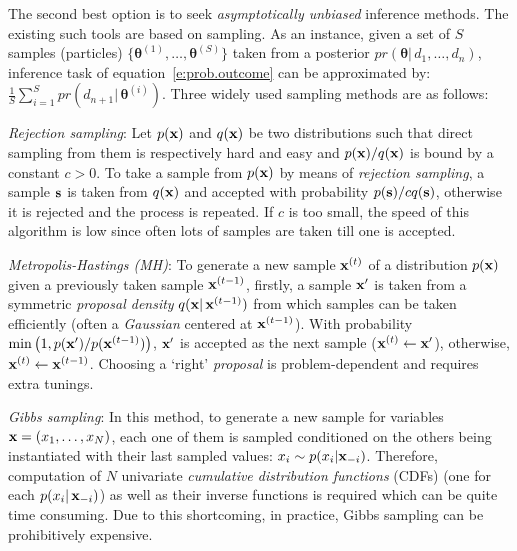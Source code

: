 The second best option is to seek \emph{asymptotically unbiased} inference methods. 
The existing such tools are based on sampling.
As an instance, given a set of $S$ samples (particles) $\{\boldsymbol\theta^{(1)}, \ldots, \boldsymbol\theta^{(S)}\}$ taken from a posterior $pr(\boldsymbol\theta | \, d_1, \ldots, d_n)$, 
inference task of equation~\ref{e:prob.outcome} can be approximated by: 
$\frac{1}{S} \sum_{i=1}^S pr(d_{n+1} | \, \boldsymbol\theta^{(i)})$.
Three widely used sampling methods are as follows:

\emph{Rejection sampling}:
Let $p(\textbf{x})$ and $q(\textbf{x})$ be two distributions 
such that direct sampling from them is respectively hard and easy
and
$p(\textbf{x})/q(\textbf{x})$ is bound by a constant $c>0$. 
To take a sample from $p(\textbf{x})$ by means of \emph{rejection sampling}, 
a sample $\textbf{s}$ is taken from $q(\textbf{x})$ and accepted with probability $p(\textbf{s}) / c q(\textbf{s})$, 
otherwise it is rejected and the process is repeated. 
If $c$ is too small, the speed of this algorithm is low since often lots of samples are taken till one is accepted.

\emph{Metropolis-Hastings (MH)}:
To generate a new sample $\textbf{x}^{(t)}$ of a distribution $p(\textbf{x})$ given a previously taken sample $\textbf{x}^{(t-1)}$, 
firstly, a sample $\textbf{x}'$ is taken 
from a symmetric \emph{proposal density} $q(\textbf{x} |\, \textbf{x}^{(t-1)})$ 
from which samples can be taken efficiently 
(often a \emph{Gaussian} centered at $\textbf{x}^{(t-1)}$). 
With probability $\min \big(1, p(\textbf{x}')/p(\textbf{x}^{(t-1)}) \big)$, 
$\textbf{x}'$ is accepted as the next sample ($\textbf{x}^{(t)} \leftarrow \textbf{x}'$), otherwise, $\textbf{x}^{(t)} \leftarrow \textbf{x}^{(t-1)}$. 
Choosing a `right' \emph{proposal} is problem-dependent and requires extra tunings. 


\emph{Gibbs sampling}:
In this method, to generate a new sample for variables $\textbf{x} = (x_1, \ldots, x_N)$, 
each one of them is sampled conditioned on the others being instantiated with their last sampled values:
$x_i \sim p(x_i | \textbf{x}_{-i})$. 
Therefore,  
computation of $N$ univariate \emph{cumulative distribution functions} (CDFs) 
(one for each $p(x_i | \, \textbf{x}_{-i})$) as well as their inverse functions is required which can be quite time consuming. 
Due to this shortcoming, in practice, Gibbs sampling can be prohibitively expensive.   

